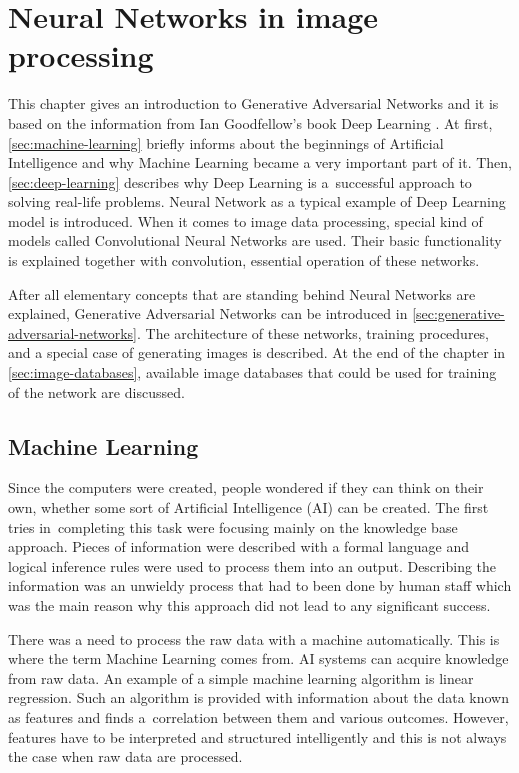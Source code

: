 \chapter{\label{chap:theory}Neural Networks in image processing}
This chapter gives an introduction to Generative Adversarial Networks and it is based on the information from Ian Goodfellow's book Deep Learning \cite{Goodfellow-et-al-2016}. At first, \autoref{sec:machine-learning} briefly informs about the beginnings of Artificial Intelligence and why Machine Learning became a very important part of it. Then, \autoref{sec:deep-learning} describes why Deep Learning is a~successful approach to solving real-life problems. Neural Network as a typical example of Deep Learning model is introduced. When it comes to image data processing, special kind of models called Convolutional Neural Networks are used. Their basic functionality is explained together with convolution, essential operation of these networks.

After all elementary concepts that are standing behind Neural Networks are explained, Generative Adversarial Networks can be introduced in \autoref{sec:generative-adversarial-networks}. The architecture of these networks, training procedures, and a special case of generating images is described. At the end of the chapter in \autoref{sec:image-databases}, available image databases that could be used for training of the network are discussed.

\section{\label{sec:machine-learning}Machine Learning}
Since the computers were created, people wondered if they can think on their own, whether some sort of Artificial Intelligence (AI) can be created. The first tries in~completing this task were focusing mainly on the knowledge base approach. Pieces of information were described with a formal language and logical inference rules were used to process them into an output. Describing the information was an unwieldy process that had to been done by human staff which was the main reason why this approach did not lead to any significant success.

There was a need to process the raw data with a machine automatically. This is where the term Machine Learning comes from. AI systems can acquire knowledge from raw data. An example of a simple machine learning algorithm is linear regression. Such an algorithm is provided with information about the data known as features and finds a~correlation between them and various outcomes. However, features have to be interpreted and structured intelligently and this is not always the case when raw data are processed.

